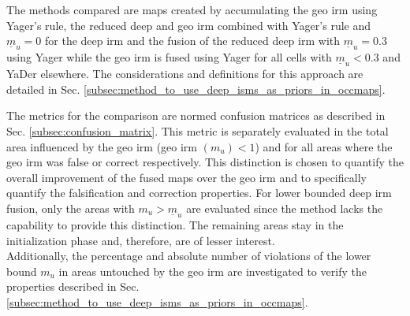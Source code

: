 The methods compared are maps created by accumulating the geo \gls{irm} using Yager's rule, the reduced deep and geo \gls{irm} combined with Yager's rule and $\underline{m}_u = 0$ for the deep \gls{irm} and the fusion of the reduced deep \gls{irm} with $\underline{m}_u = 0.3$ using Yager while the geo \gls{irm} is fused using Yager for all cells with $\underline{m}_u < 0.3$ and YaDer elsewhere. The considerations and definitions for this approach are detailed in Sec. \ref{subsec:method_to_use_deep_isms_as_priors_in_occmaps}. 

The metrics for the comparison are normed confusion matrices as described in Sec. \ref{subsec:confusion_matrix}. This metric is separately evaluated in the total area influenced by the geo \gls{irm} (geo \gls{irm} $(m_u) < 1$) and for all areas where the geo \gls{irm} was false or correct respectively. This distinction is chosen to quantify the overall improvement of the fused maps over the geo \gls{irm} and to specifically quantify the falsification and correction properties. For lower bounded deep \gls{irm} fusion, only the areas with $m_u > \underline{m}_u$ are evaluated since the method lacks the capability to provide this distinction. The remaining areas stay in the initialization phase and, therefore, are of lesser interest.\\
Additionally, the percentage and absolute number of violations of the lower bound $m_u$ in areas untouched by the geo \gls{irm} are investigated to verify the properties described in Sec. \ref{subsec:method_to_use_deep_isms_as_priors_in_occmaps}.
%
